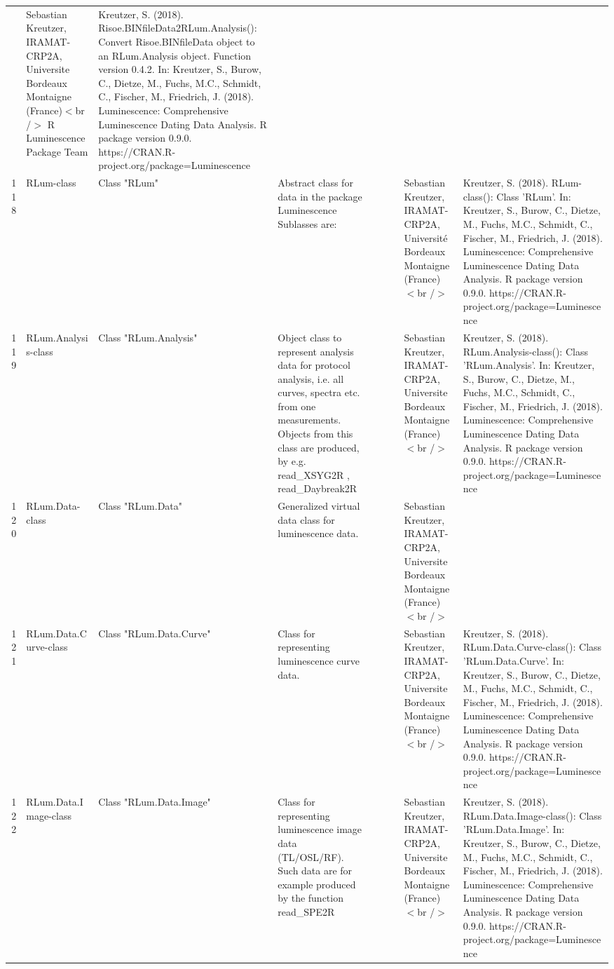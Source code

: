 \begin{table}[ht]
\begin{tabular}{rllllllll}
 & Sebastian Kreutzer, IRAMAT-CRP2A, Universite Bordeaux Montaigne (France)$<$br /$>$  R Luminescence Package Team & Kreutzer, S. (2018). Risoe.BINfileData2RLum.Analysis(): Convert Risoe.BINfileData object to an RLum.Analysis object. Function version 0.4.2. In: Kreutzer, S., Burow, C., Dietze, M., Fuchs, M.C., Schmidt, C., Fischer, M., Friedrich, J. (2018). Luminescence: Comprehensive Luminescence Dating Data Analysis. R package version 0.9.0. https://CRAN.R-project.org/package=Luminescence
 \\ 
  118 & RLum-class & Class  "RLum" & Abstract class for data in the package Luminescence Sublasses are: &  &  &  & Sebastian Kreutzer, IRAMAT-CRP2A, Université Bordeaux Montaigne (France)$<$br /$>$ & Kreutzer, S. (2018). RLum-class(): Class 'RLum'. In: Kreutzer, S., Burow, C., Dietze, M., Fuchs, M.C., Schmidt, C., Fischer, M., Friedrich, J. (2018). Luminescence: Comprehensive Luminescence Dating Data Analysis. R package version 0.9.0. https://CRAN.R-project.org/package=Luminescence
 \\ 
  119 & RLum.Analysis-class & Class  "RLum.Analysis" & Object class to represent analysis data for protocol analysis, i.e. all curves, spectra etc. from one measurements. Objects from this class are produced, by e.g.  read\_XSYG2R ,  read\_Daybreak2R &  &  &  & Sebastian Kreutzer, IRAMAT-CRP2A, Universite Bordeaux Montaigne (France)$<$br /$>$ & Kreutzer, S. (2018). RLum.Analysis-class(): Class 'RLum.Analysis'. In: Kreutzer, S., Burow, C., Dietze, M., Fuchs, M.C., Schmidt, C., Fischer, M., Friedrich, J. (2018). Luminescence: Comprehensive Luminescence Dating Data Analysis. R package version 0.9.0. https://CRAN.R-project.org/package=Luminescence
 \\ 
  120 & RLum.Data-class & Class  "RLum.Data" & Generalized virtual data class for luminescence data. &  &  &  & Sebastian Kreutzer, IRAMAT-CRP2A, Universite Bordeaux Montaigne (France)$<$br /$>$ &  \\ 
  121 & RLum.Data.Curve-class & Class  "RLum.Data.Curve" & Class for representing luminescence curve data. &  &  &  & Sebastian Kreutzer, IRAMAT-CRP2A, Universite Bordeaux Montaigne (France)$<$br /$>$ & Kreutzer, S. (2018). RLum.Data.Curve-class(): Class 'RLum.Data.Curve'. In: Kreutzer, S., Burow, C., Dietze, M., Fuchs, M.C., Schmidt, C., Fischer, M., Friedrich, J. (2018). Luminescence: Comprehensive Luminescence Dating Data Analysis. R package version 0.9.0. https://CRAN.R-project.org/package=Luminescence
 \\ 
  122 & RLum.Data.Image-class & Class  "RLum.Data.Image" & Class for representing luminescence image data (TL/OSL/RF). Such data are for example produced by the function  read\_SPE2R &  &  &  & Sebastian Kreutzer, IRAMAT-CRP2A, Universite Bordeaux Montaigne (France)$<$br /$>$ & Kreutzer, S. (2018). RLum.Data.Image-class(): Class 'RLum.Data.Image'. In: Kreutzer, S., Burow, C., Dietze, M., Fuchs, M.C., Schmidt, C., Fischer, M., Friedrich, J. (2018). Luminescence: Comprehensive Luminescence Dating Data Analysis. R package version 0.9.0. https://CRAN.R-project.org/package=Luminescence

\end{tabular}
\end{table}
